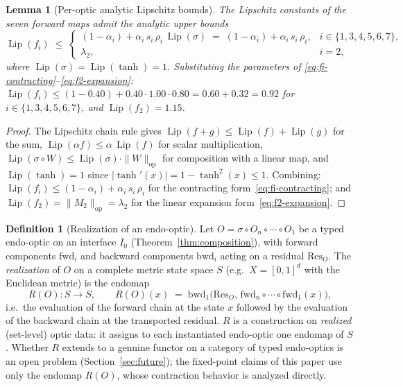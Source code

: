 \documentclass[11pt,a4paper]{article}
\theoremstyle{plain}
\newtheorem{lemma}[theorem]{Lemma}
\theoremstyle{definition}
\newtheorem{definition}[theorem]{Definition}
\theoremstyle{remark}
\DeclareMathOperator{\Lip}{Lip}
\begin{document}
\begin{lemma}[Per-optic analytic Lipschitz bounds]
\label{lem:lip-per-optic}
The Lipschitz constants of the seven forward maps admit the analytic
upper bounds
\begin{equation}\label{eq:lip-per-optic}
  \Lip(f_{i}) \;\leq\;
  \begin{cases}
  (1-\alpha_{i})+\alpha_{i}\,s_{i}\,\rho_{i}\,\Lip(\sigma)
   \;=\; (1-\alpha_{i})+\alpha_{i}\,s_{i}\,\rho_{i},
   & i\in\{1,3,4,5,6,7\},\\[4pt]
  \lambda_{2}, & i=2,
  \end{cases}
\end{equation}
where $\Lip(\sigma)=\Lip(\tanh)=1$. Substituting the parameters of
\eqref{eq:fi-contracting}--\eqref{eq:f2-expansion}:
$\Lip(f_{i})\leq (1-0.40)+0.40\cdot 1.00\cdot 0.80 = 0.60+0.32=0.92$
for $i\in\{1,3,4,5,6,7\}$, and $\Lip(f_{2})=1.15$.
\end{lemma}

\begin{proof}
The Lipschitz chain rule gives $\Lip(f+g)\leq \Lip(f)+\Lip(g)$ for the
sum, $\Lip(\alpha f)\leq \alpha\,\Lip(f)$ for scalar multiplication,
$\Lip(\sigma\circ W)\leq \Lip(\sigma)\cdot\|W\|_{\mathrm{op}}$ for
composition with a linear map, and $\Lip(\tanh)=1$ since
$|\tanh'(x)|=1-\tanh^{2}(x)\leq 1$. Combining:
$\Lip(f_{i})\leq (1-\alpha_{i})+\alpha_{i}\,s_{i}\,\rho_{i}$ for the
contracting form~\eqref{eq:fi-contracting}; and $\Lip(f_{2})=
\|M_{2}\|_{\mathrm{op}}=\lambda_{2}$ for the linear expansion
form~\eqref{eq:f2-expansion}.
\end{proof}

\begin{definition}[Realization of an endo-optic]
\label{def:realization}
Let $O = \sigma \circ O_n \circ \cdots \circ O_1$ be a typed
endo-optic on an interface $I_0$
(Theorem~\ref{thm:composition}), with forward components
$\mathrm{fwd}_i$ and backward components $\mathrm{bwd}_i$ acting on a
residual $\mathrm{Res}_O$. The \emph{realization} of $O$ on a
complete metric state space $S$ (e.g.\ $X=[0,1]^d$ with the Euclidean
metric) is the endomap
\begin{equation}\label{eq:realization}
  R(O) : S \to S, \qquad
  R(O)(x) \;=\; \mathrm{bwd}_1\!\bigl(\mathrm{Res}_O,\,
  \mathrm{fwd}_n \circ \cdots \circ \mathrm{fwd}_1(x)\bigr),
\end{equation}
i.e.\ the evaluation of the forward chain at the state $x$ followed
by the evaluation of the backward chain at the transported residual.
$R$ is a construction on \emph{realized} (set-level) optic data: it
assigns to each instantiated endo-optic one endomap of $S$. Whether
$R$ extends to a genuine functor on a category of typed endo-optics
is an open problem (Section~\ref{sec:future}); the fixed-point
claims of this paper use only the endomap $R(O)$, whose contraction
behavior is analyzed directly.
\end{definition}
\end{document}

